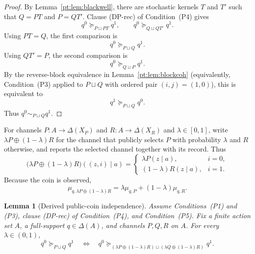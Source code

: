 \documentclass[11pt,a4paper]{article}
\newtheorem{lemma}[theorem]{Lemma}
\theoremstyle{definition}
\newcommand{\1}{\mathbf 1}
\begin{document}
\begin{proof}
By Lemma~\ref{pt:lem:blackwell}, there are stochastic kernels $T$ and $T'$ such that $Q=PT$ and $P=QT'$.  Clause
\textup{(DP-rec)} of Condition~\textup{(P4)} gives
\[
q^0\succeq_{P\sqcup PT}q^1,
\qquad
q^0\succeq_{Q\sqcup QT'}q^1.
\]
Using $PT=Q$, the first comparison is
\[
q^0\succeq_{P\sqcup Q}q^1.
\]
Using $QT'=P$, the second comparison is
\[
q^0\succeq_{Q\sqcup P}q^1.
\]
By the reverse-block equivalence in Lemma~\ref{pt:lem:blockcoh} (equivalently, Condition~\textup{(P3)} applied to
$P\sqcup Q$ with ordered pair $(i,j)=(1,0)$), this is equivalent to
\[
q^1\succeq_{P\sqcup Q}q^0.
\]
Thus $q^0\sim_{P\sqcup Q}q^1$.
\end{proof}

For channels $P:A\to\Delta(X_P)$ and $R:A\to\Delta(X_R)$ and $\lambda\in[0,1]$, write
$\lambda P\oplus(1-\lambda)R$ for the channel that publicly selects $P$ with probability $\lambda$ and $R$ otherwise,
and reports the selected channel together with its record.  Thus
\[
\bigl(\lambda P\oplus(1-\lambda)R\bigr)((z,i)\mid a)
=
\begin{cases}
\lambda P(z\mid a),&i=0,\\
(1-\lambda)R(z\mid a),&i=1.
\end{cases}
\]
Because the coin is observed,
\[
\mu_{q,\lambda P\oplus(1-\lambda)R}
=\lambda\mu_{q,P}+(1-\lambda)\mu_{q,R}.
\]

\begin{lemma}[Derived public-coin independence]\label{pt:lem:publiccoin}
Assume Conditions~\textup{(P1)} and \textup{(P3)}, clause \textup{(DP-rec)} of Condition~\textup{(P4)}, and
Condition~\textup{(P5)}.  Fix a finite action set $A$, a
full-support $q\in\Delta(A)$, and channels $P,Q,R$ on $A$.  For every $\lambda\in(0,1)$,
\[
q^0\succeq_{P\sqcup Q}q^1
\quad\Longleftrightarrow\quad
q^0\succeq_{(\lambda P\oplus(1-\lambda)R)\sqcup(\lambda Q\oplus(1-\lambda)R)}q^1.
\]
\end{lemma}
\end{document}
